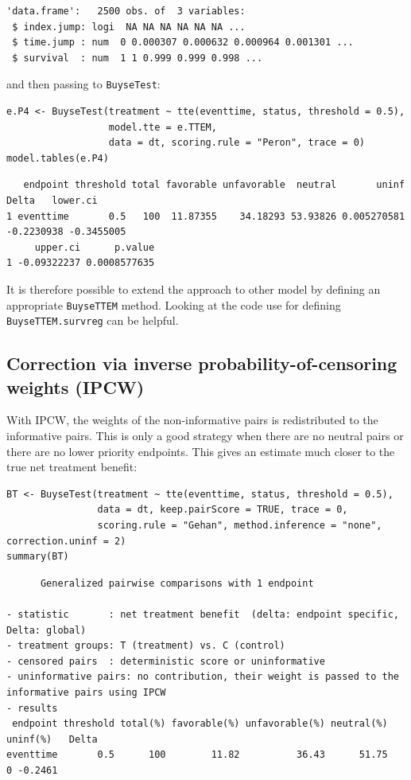 \documentclass[12pt]{article}
\begin{document}
\begin{verbatim}
'data.frame':	2500 obs. of  3 variables:
 $ index.jump: logi  NA NA NA NA NA NA ...
 $ time.jump : num  0 0.000307 0.000632 0.000964 0.001301 ...
 $ survival  : num  1 1 0.999 0.999 0.998 ...
\end{verbatim}


and then passing to \texttt{BuyseTest}:
\lstset{language=r,label= ,caption= ,captionpos=b,numbers=none}
\begin{lstlisting}
e.P4 <- BuyseTest(treatment ~ tte(eventtime, status, threshold = 0.5),
                  model.tte = e.TTEM,
                  data = dt, scoring.rule = "Peron", trace = 0)
model.tables(e.P4)
\end{lstlisting}

\begin{verbatim}
   endpoint threshold total favorable unfavorable  neutral       uninf      Delta   lower.ci
1 eventtime       0.5   100  11.87355    34.18293 53.93826 0.005270581 -0.2230938 -0.3455005
     upper.ci      p.value
1 -0.09322237 0.0008577635
\end{verbatim}


It is therefore possible to extend the approach to other model by
defining an appropriate \texttt{BuyseTTEM} method. Looking at the code use
for defining \texttt{BuyseTTEM.survreg} can be helpful.

\subsection{Correction via inverse probability-of-censoring weights (IPCW)}
\label{sec:orgc137478}

With IPCW, the weights of the non-informative pairs is redistributed
to the informative pairs. This is only a good strategy when there are
no neutral pairs or there are no lower priority endpoints. This gives
an estimate much closer to the true net treatment benefit:
\lstset{language=r,label= ,caption= ,captionpos=b,numbers=none}
\begin{lstlisting}
BT <- BuyseTest(treatment ~ tte(eventtime, status, threshold = 0.5),
                data = dt, keep.pairScore = TRUE, trace = 0,
                scoring.rule = "Gehan", method.inference = "none", correction.uninf = 2)
summary(BT)
\end{lstlisting}

\begin{verbatim}
      Generalized pairwise comparisons with 1 endpoint

- statistic       : net treatment benefit  (delta: endpoint specific, Delta: global) 
- treatment groups: T (treatment) vs. C (control) 
- censored pairs  : deterministic score or uninformative
- uninformative pairs: no contribution, their weight is passed to the informative pairs using IPCW
- results
 endpoint threshold total(%) favorable(%) unfavorable(%) neutral(%) uninf(%)   Delta
eventtime       0.5      100        11.82          36.43      51.75        0 -0.2461
\end{verbatim}
\end{document}
